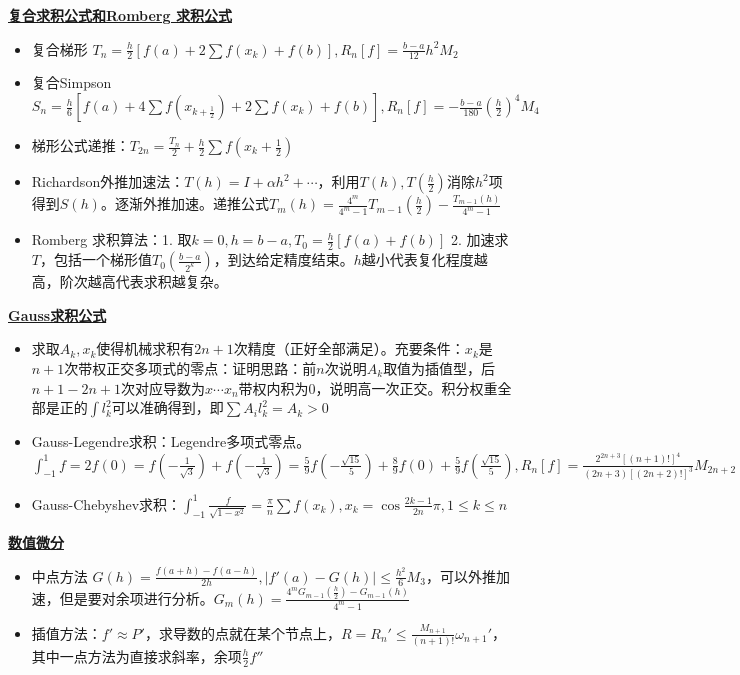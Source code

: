 \documentclass[UTF8,a4paper,landscape,8pt]{paper}
\renewcommand{\subsection}[1]{{\small\textbf{\underline{#1}}}\\ }
\newcommand{\List}[1]{\begin{itemize}[fullwidth,itemindent=0em] #1 \end{itemize}}
\begin{document}
\begin{multicols}{4}
    \subsection{复合求积公式和Romberg 求积公式}
    \List{
        \item {复合梯形 $T_n = \frac{h}{2}[f(a) + 2 \sum f(x_k) + f(b)], R_n[f] = \frac{b-a}{12}h^2M_2$}
        \item {复合Simpson $S_n = \frac{h}{6}[f(a) + 4 \sum f(x_{k+\frac12}) + 2\sum f(x_k) + f(b)],R_n[f] = -\frac{b-a}{180}(\frac{h}{2})^4M_4$}
        \item {梯形公式递推：$T_{2n} = \frac{T_n}{2} + \frac{h}{2}\sum f(x_k+\frac12)$}
        \item {Richardson外推加速法：$T(h) = I + \alpha h^2 + \cdots $，利用$T(h),T(\frac h2)$消除$h^2$项得到$S(h)$。逐渐外推加速。递推公式$T_m(h) = \frac{4^m}{4^m-1}T_{m-1}(\frac h2) - \frac {T_{m-1}(h)}{4^m-1}$}
        \item {Romberg 求积算法：1. 取$k=0,h=b-a,T_0=\frac h2[f(a)+f(b)]$ 2. 加速求$T$，包括一个梯形值$T_0(\frac{b-a}{2^k})$，到达给定精度结束。$h$越小代表复化程度越高，阶次越高代表求积越复杂。} 
    }
    \subsection{Gauss求积公式}
    \List{
        \item {求取$A_k,x_k$使得机械求积有$2n+1$次精度（正好全部满足）。充要条件：$x_k$是$n+1$次带权正交多项式的零点：证明思路：前$n$次说明$A_k$取值为插值型，后$n+1 - 2n+1 $次对应导数为$x \cdots x_n$带权内积为0，说明高一次正交。积分权重全部是正的$\int l_k^2$可以准确得到，即$\sum A_il_k^2 = A_k >0$}
        \item {Gauss-Legendre求积：Legendre多项式零点。$\int^1_{-1}f = 2f(0) = f(-\frac{1}{\sqrt{3}}) + f(-\frac{1}{\sqrt{3}}) = \frac59f(-\frac{\sqrt{15}}5) + \frac89f(0) + \frac59f(\frac{\sqrt{15}}5), R_n[f] = \frac{2^{2n+3}[(n+1)!]^4}{(2n+3)[(2n+2)!]^3}M_{2n+2}$}
        \item {Gauss-Chebyshev求积：$\int_{-1}^1 \frac f{\sqrt{1-x^2}} = \frac \pi n\sum f(x_k), x_k = \cos\frac{2k-1}{2n}\pi, 1 \le k \le n$}
    }
    \subsection{数值微分}
    \List{
        \item {中点方法 $G(h) = \frac{f(a+h) - f(a-h)}{2h}, |f'(a) -G(h)| \le \frac{h^2}{6}M_3$，可以外推加速，但是要对余项进行分析。$G_m(h) = \frac{4^mG_{m-1}(\frac h2) - G_{m-1}(h)}{4^m-1}$}
        \item {插值方法：$f' \approx P'$，求导数的点就在某个节点上，$R = R_n' \le \frac{M_{n+1}}{(n+1)!}\omega_{n+1}'$，其中一点方法为直接求斜率，余项$\frac h2 f''$}
    }

\end{multicols}
\end{document}
